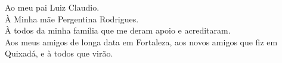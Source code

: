 \begin{dedicatoria}
   \vspace*{\fill}
   	\begin{flushright}
   \noindent
    Ao meu pai Luiz Claudio.\\
    À Minha mãe Pergentina Rodrigues.\\
    À todos da minha família que me deram apoio e acreditaram.\\
    Aos meus amigos de longa data em Fortaleza, aos novos amigos que fiz em Quixadá, e à todos que virão.
   	\end{flushright}
\end{dedicatoria}
